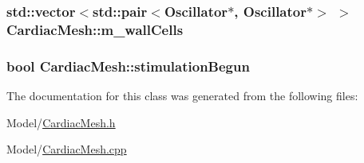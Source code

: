\hypertarget{class_cardiac_mesh_a80e29d81b758c0294d673ae731f26343}{
\subsubsection[{m\+\_\+wall\+Cells}]{\setlength{\rightskip}{0pt plus 5cm}std\+::vector$<$std\+::pair$<${\bf Oscillator}$\ast$, {\bf Oscillator}$\ast$$>$ $>$ Cardiac\+Mesh\+::m\+\_\+wall\+Cells}}\label{class_cardiac_mesh_a80e29d81b758c0294d673ae731f26343}
\hypertarget{class_cardiac_mesh_ac14b1f228c8426e067df4a925824348e}{
\subsubsection[{stimulation\+Begun}]{\setlength{\rightskip}{0pt plus 5cm}bool Cardiac\+Mesh\+::stimulation\+Begun}}\label{class_cardiac_mesh_ac14b1f228c8426e067df4a925824348e}


The documentation for this class was generated from the following files\+:\begin{DoxyCompactItemize}
\item 
Model/\hyperlink{_cardiac_mesh_8h}{Cardiac\+Mesh.\+h}\item 
Model/\hyperlink{_cardiac_mesh_8cpp}{Cardiac\+Mesh.\+cpp}\end{DoxyCompactItemize}

